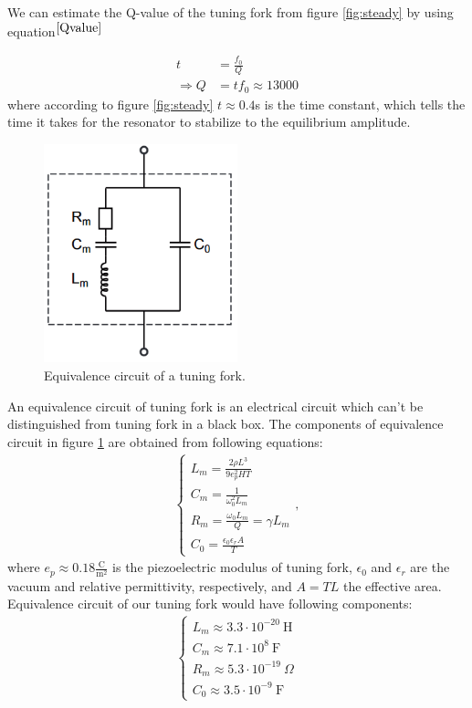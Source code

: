 \documentclass[12pt]{article}
\begin{document}
We can estimate the Q-value of the tuning fork from figure \ref{fig:steady} by using equation$^{\cite{Qvalue}}$

\begin{align*}
t &= \frac{f_0}{Q}\\
\Rightarrow Q &= tf_0 \approx 13000
\end{align*}
where according to figure \ref{fig:steady} $t \approx 0.4$s is the time constant, which tells the time it takes for the resonator to stabilize to the equilibrium amplitude.

\begin{figure}
\centering
\includegraphics[width = 0.5\textwidth]{equivalence_circuit}
\caption{Equivalence circuit of a tuning fork.} \label{fig:equivalence_circuit}
\end{figure}

An equivalence circuit of tuning fork is an electrical circuit which can't be distinguished from tuning fork in a black box. The components of equivalence circuit in figure \ref{fig:equivalence_circuit} are obtained from following equations:
\begin{align}
\begin{cases}
L_m = \frac{2\rho L^3}{9e_p^2HT}\\
C_m = \frac{1}{\omega_0^2L_m}\\
R_m = \frac{\omega_0 L_m}{Q}=\gamma L_m\\
C_0 = \frac{\epsilon_0\epsilon_rA}{T}
\end{cases},
\end{align}
where $e_p \approx 0.18 \frac{\mathrm{C}}{\mathrm{m}^2}$ is the piezoelectric modulus of tuning fork, $\epsilon_0$ and $\epsilon_r$ are the vacuum and relative permittivity, respectively, and $A = TL$ the effective area. Equivalence circuit of our tuning fork would have following components:
\begin{align*}
\begin{cases}
L_m \approx 3.3\cdot10^{-20}~\mathrm{H}\\
C_m \approx 7.1\cdot10^8~\mathrm{F}\\
R_m \approx 5.3\cdot10^{-19}~\Omega\\
C_0 \approx 3.5\cdot10^{-9}~\mathrm{F}
\end{cases}
\end{align*}
\end{document}
